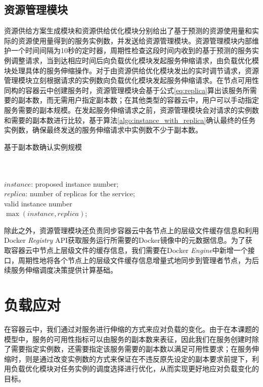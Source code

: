 \subsection{资源管理模块}\label{sec:provision_utils}
资源供给方案生成模块和资源供给优化模块分别给出了基于预测的资源使用量和实际的资源使用量得到的服务实例数，并发送给资源管理模块。资源管理模块内部维护一个时间间隔为10秒的定时器，周期性检查这段时间内收到的基于预测的服务实例调整请求，当到达相应时间后向负载优化模块发起服务伸缩请求，由负载优化模块处理具体的服务伸缩操作。对于由资源供给优化模块发出的实时调节请求，资源管理模块立刻根据请求的实例数向负载优化模块发起服务伸缩请求。在节点可用性同构的容器云中创建服务时，资源管理模块会基于公式\ref{eq:replica}算出该服务所需要的副本数，而无需用户指定副本数；在其他类型的容器云中，用户可以手动指定服务需要的副本规模。在发起服务伸缩请求之前，资源管理模块会对请求的实例数和需要的副本数进行比较，基于算法\ref{algo:instance_with_replica}确认最终的任务实例数，确保最终发送的服务伸缩请求中实例数不少于副本数。
\begin{algorithm}[H]
\caption{基于副本数确认实例规模}
\label{algo:instance_with_replica}
\begin{algorithmic}[0]
\\
\Require ~~\
\\
$instance$: proposed instance number;\\
$replica$: number of replicas for the service;
\Ensure ~~\
\\
valid instance number\\

\State \Return $\max {(instance, replica)}$;
\end{algorithmic}
\end{algorithm}

除此之外，资源管理模块还负责同步容器云中各节点上的层级文件缓存信息和利用Docker \emph{Registry} API获取服务运行所需要的Docker镜像中的元数据信息。为了获取容器云中节点上层级文件的缓存信息，我们需要在Docker \emph{Engine}中新增一个接口，周期性地将各个节点上的层级文件缓存信息增量式地同步到管理者节点，为后续服务伸缩调度决策提供计算基础。

\section{负载应对}
在容器云中，我们通过对服务进行伸缩的方式来应对负载的变化。由于在本课题的模型中，服务的可用性指标可以由服务的副本数来表征，因此我们在服务创建时除了需要指定实例数，还需要指定该服务需要的副本数以满足可用性要求；在服务伸缩时，则是通过改变实例数的方式来保证在不违反原先设定的副本要求前提下，利用负载优化模块对任务实例的调度选择进行优化，从而实现更好地应对负载变化的目标。

